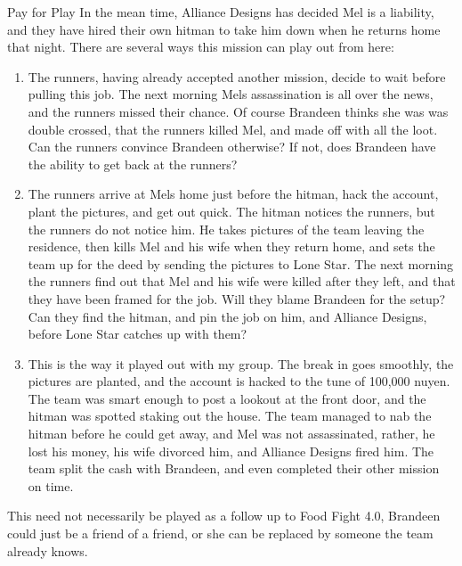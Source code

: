 \begin{scenario}{Pay for Play}
In the mean time, Alliance Designs has decided Mel is a liability, and they have hired their own hitman to take him down when he returns home that night. There are several ways this mission can play out from here:

\begin{enumerate}

\item The runners, having already accepted another mission, decide to wait before pulling this job. The next morning Mels assassination is all over the news, and the runners missed their chance. Of course Brandeen thinks she was was double crossed, that the runners killed Mel, and made off with all the loot. Can the runners convince Brandeen otherwise? If not, does Brandeen have the ability to get back at the runners?

\item The runners arrive at Mels home just before the hitman, hack the account, plant the pictures, and get out quick. The hitman notices the runners, but the runners do not notice him. He takes pictures of the team leaving the residence, then kills Mel and his wife when they return home, and sets the team up for the deed by sending the pictures to Lone Star. The next morning the runners find out that Mel and his wife were killed after they left, and that they have been framed for the job. Will they blame Brandeen for the setup? Can they find the hitman, and pin the job on him, and Alliance Designs, before Lone Star catches up with them?

\item This is the way it played out with my group. The break in goes smoothly, the pictures are planted, and the account is hacked to the tune of 100,000 nuyen. The team was smart enough to post a lookout at the front door, and the hitman was spotted staking out the house. The team managed to nab the hitman before he could get away, and Mel was not assassinated, rather, he lost his money, his wife divorced him, and Alliance Designs fired him. The team split the cash with Brandeen, and even completed their other mission on time.

\end{enumerate}

\notes This need not necessarily be played as a follow up to Food Fight 4.0, Brandeen could just be a friend of a friend, or she can be replaced by someone the team already knows. 

\end{scenario}
